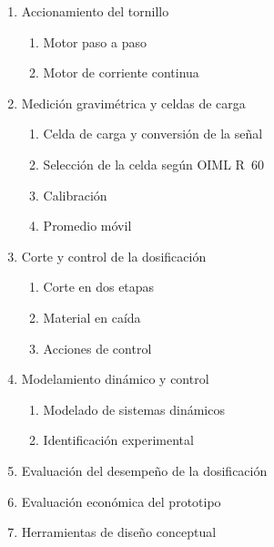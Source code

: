 \begin{enumerate}[label*=\arabic*.]
\begin{enumerate}[label*=\arabic*.]
\begin{enumerate}[label*=\arabic*.]
            \item Accionamiento del tornillo
            \begin{enumerate}[label*=\arabic*.]
                \item Motor paso a paso
                \item Motor de corriente continua
            \end{enumerate}

            \item Medición gravimétrica y celdas de carga
            \begin{enumerate}[label*=\arabic*.]
                \item Celda de carga y conversión de la señal
                \item Selección de la celda según OIML R~60
                \item Calibración
                \item Promedio móvil
            \end{enumerate}

            \item Corte y control de la dosificación
            \begin{enumerate}[label*=\arabic*.]
                \item Corte en dos etapas
                \item Material en caída
                \item Acciones de control
            \end{enumerate}

            \item Modelamiento dinámico y control
            \begin{enumerate}[label*=\arabic*.]
                \item Modelado de sistemas dinámicos
                \item Identificación experimental
            \end{enumerate}

            \item Evaluación del desempeño de la dosificación

            \item Evaluación económica del prototipo

            \item Herramientas de diseño conceptual
        \end{enumerate}
    \end{enumerate}


\end{enumerate}
